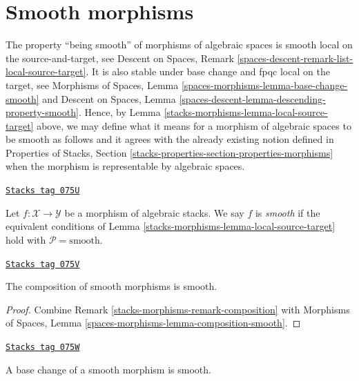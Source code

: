 \section{Smooth morphisms}
\label{stacks-morphisms-section-smooth}
The property ``being smooth'' of morphisms of algebraic
spaces is smooth local on the source-and-target, see
Descent on Spaces, Remark \ref{spaces-descent-remark-list-local-source-target}.
It is also stable under base change and fpqc local on the target, see
Morphisms of Spaces,
Lemma \ref{spaces-morphisms-lemma-base-change-smooth}
and
Descent on Spaces, Lemma
\ref{spaces-descent-lemma-descending-property-smooth}.
Hence, by
Lemma \ref{stacks-morphisms-lemma-local-source-target}
above, we may define what it means for a morphism of algebraic spaces
to be smooth as follows and it agrees with the already
existing notion defined in
Properties of Stacks,
Section \ref{stacks-properties-section-properties-morphisms}
when the morphism is representable by algebraic spaces.

\begin{definition}[Smooth]
\label{stacks-morphisms-definition-smooth}
\href{https://stacks.math.columbia.edu/tag/075U}{\texttt{Stacks tag 075U}}

Let $f : \mathcal{X} \to \mathcal{Y}$ be a morphism of algebraic stacks.
We say $f$ is {\it smooth} if the equivalent conditions of
Lemma \ref{stacks-morphisms-lemma-local-source-target}
hold with $\mathcal{P} = \text{smooth}$.
\end{definition}

\begin{lemma}
\label{stacks-morphisms-lemma-composition-smooth}
\href{https://stacks.math.columbia.edu/tag/075V}{\texttt{Stacks tag 075V}}

The composition of smooth morphisms is smooth.
\end{lemma}

\begin{proof}
Combine
Remark \ref{stacks-morphisms-remark-composition}
with
Morphisms of Spaces, Lemma
\ref{spaces-morphisms-lemma-composition-smooth}.
\end{proof}

\begin{lemma}
\label{stacks-morphisms-lemma-base-change-smooth}
\href{https://stacks.math.columbia.edu/tag/075W}{\texttt{Stacks tag 075W}}

A base change of a smooth morphism is smooth.
\end{lemma}

